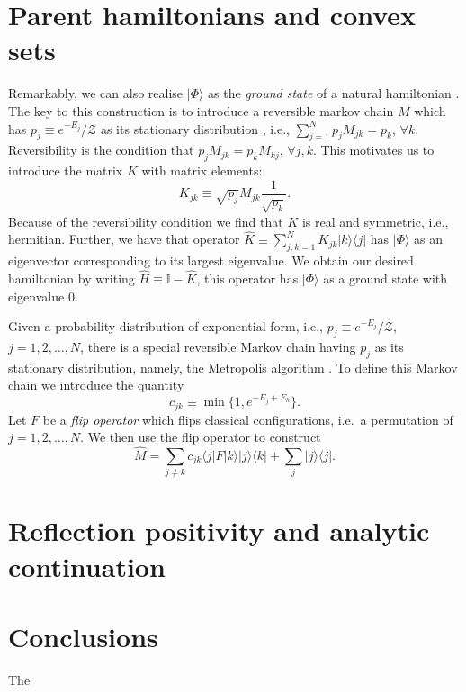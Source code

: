 \documentclass[twocolumn,lengthcheck,superscriptaddress]{revtex4-1}
\theoremstyle{definition}
\theoremstyle{remark}
\begin{document}
\section{Parent hamiltonians and convex sets}
Remarkably, we can also realise $|\Phi\rangle$ as the \emph{ground state} of a natural hamiltonian \cite{ardonne:2004a, verstraete:2006a, perez-garcia:2008a, horava:2008a}. The key to this construction is to introduce a reversible markov chain $M$ which has $p_j \equiv  e^{-E_j}/\mathcal{Z}$ as its stationary distribution \cite{norris:1997a}, i.e., $\sum_{j=1}^N p_jM_{jk} = p_k$, $\forall k$. Reversibility is the condition that $p_j M_{jk} = p_kM_{kj}$, $\forall j,k$. This motivates us to introduce the  matrix $K$ with matrix elements:
\begin{equation}
	K_{jk} \equiv \sqrt{p_j} M_{jk} \frac{1}{\sqrt{p_k}}.
\end{equation}
Because of the reversibility condition we find that $K$ is real and symmetric, i.e., hermitian. Further, we have that operator $\widehat{K} \equiv  \sum_{j,k=1}^N K_{jk}|k\rangle \langle j|$ has $|\Phi\rangle$ as an eigenvector corresponding to its largest eigenvalue. We obtain our desired hamiltonian by writing $\widehat{H} \equiv \mathbb{I} - \widehat{K}$, this operator has $|\Phi\rangle$ as a ground state with eigenvalue $0$.

Given a probability distribution of exponential form, i.e., $p_j \equiv  e^{-E_j}/\mathcal{Z}$, $j=1, 2, \ldots, N$, there is a special reversible Markov chain having $p_j$ as its stationary distribution, namely, the Metropolis algorithm \cite{metropolis:1953a}. To define this Markov chain we introduce the quantity
\begin{equation}
	c_{jk} \equiv \min\{1, e^{-E_j+E_k}\}.
\end{equation}
Let $F$ be a \emph{flip operator} which flips classical configurations, i.e.\ a permutation of $j=1, 2, \ldots, N$. We then use the flip operator to construct
\begin{equation}
	\widehat{M} = \sum_{j\not=k} c_{jk}\langle j|F|k\rangle |j\rangle \langle k| + \sum_{j} |j\rangle \langle j|.
\end{equation} 



\section{Reflection positivity and analytic continuation}

\section{Conclusions}
The
\end{document}
